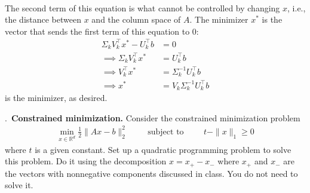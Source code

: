 \documentclass{letter}
\newcounter{problem}
\newcommand{\Problem}[2]{%
	\stepcounter{problem}%
	\leftskip=0pt%
	\theproblem.~\textbf{{#1.}} #2 \par%
}
\newcommand{\T}{\intercal}
\newcommand{\R}{\mathbb{R}}
\begin{document}
{\begin{align*}
    \end{align*} The second term of this equation is what cannot be controlled by changing $x$, i.e., the distance between $x$ and the column space of $A$. The minimizer $x^*$ is the vector that sends the first term of this equation to 0: \begin{align*}
        \Sigma_k V_k^\T x^* - U_k^\T b &= 0 \\
        \implies \Sigma_k V_k^\T x^* &= U_k^\T b \\
        \implies V_k^\T x^* &= \Sigma_k^{-1} U_k^\T b \\
        \implies x^* &= V_k \Sigma_k^{-1} U_k^\T b
    \end{align*} is the minimizer, as desired.}

    \Problem{Constrained minimization}{Consider the constrained minimization problem \begin{align*}
        \min_{x \in \R^d} \frac{1}{2}\|Ax - b\|^2_2 \hspace{1cm} \text{subject to} \hspace{1cm} t - \|x\|_1 \geq 0
    \end{align*} where $t$ is a given constant. Set up a quadratic programming problem to solve this problem. Do it using the decomposition $x = x_+ - x_-$ where $x_+$ and $x_-$ are the vectors with nonnegative components discussed in class. You do not need to solve it.}
\end{document}
